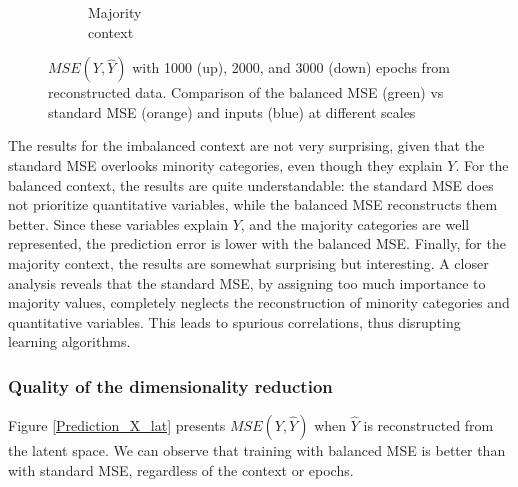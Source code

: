 \documentclass{article}
\def \w {\widehat}
\theoremstyle{definition}
\begin{document}
\begin{figure}[ht]
\begin{subfigure}[b]{0.15\textwidth}
         \caption{Majority \\ context}
         \label{Prediction_Majo_X}
     \end{subfigure}
     \caption{$MSE(Y, \w Y)$ with 1000 (up), 2000, and 3000 (down) epochs from reconstructed data. Comparison of the balanced MSE (green) vs standard MSE (orange) and inputs (blue) at different scales }
     \label{Prediction_X}
\end{figure}

The results for the imbalanced context are not very surprising, given that the standard MSE overlooks minority categories, even though they explain $Y$. For the balanced context, the results are quite understandable: the standard MSE does not prioritize quantitative variables, while the balanced MSE reconstructs them better. Since these variables explain $Y$, and the majority categories are well represented, the prediction error is lower with the balanced MSE. Finally, for the majority context, the results are somewhat surprising but interesting. A closer analysis reveals that the standard MSE, by assigning too much importance to majority values, completely neglects the reconstruction of minority categories and quantitative variables. This leads to spurious correlations, thus disrupting learning algorithms.

\subsubsection{Quality of the dimensionality reduction}

Figure \ref{Prediction_X_lat} presents $MSE(Y,\w Y)$ when $\w Y$ is reconstructed from the latent space.  We can observe that training with balanced MSE is better than with standard MSE, regardless of the context or epochs.
\end{document}
